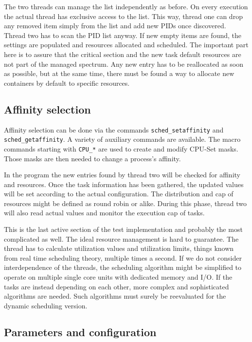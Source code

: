 \documentclass[]{scrartcl}
\begin{document}
The two threads can manage the list independently as before. On every execution the actual thread has exclusive access to the list.
This way, thread one can drop any removed item simply from the list and add new PIDs once discovered. 
Thread two has to scan the PID list anyway.
If new empty items are found, the settings are populated and resources allocated and scheduled.
The important part here is to assure that the critical section and the new task default resources are not part of the managed spectrum.
Any new entry has to be reallocated as soon as possible, but at the same time, there must be found a way to allocate new containers by default to specific resources.

\subsection{Affinity selection}

Affinity selection can be done via the commands \texttt{sched\_setaffinity} and \texttt{sched\_getaffinity}.
A variety of auxiliary commands are available. 
The macro commands starting with \texttt{CPU\_*} are used to create and modify CPU-Set masks.
Those masks are then needed to change a process's affinity.

In the program the new entries found by thread two will be checked for affinity and resources.
Once the task information has been gathered, the updated values will be set according to the actual configuration.
The distribution and cap of resources might be defined as round robin or alike.
During this phase, thread two will also read actual values and monitor the execution cap of tasks.

This is the last active section of the test implementation and probably the most complicated as well.
The ideal resource management is hard to guarantee.
The thread has to calculate utilization values and utilization limits, things known from real time scheduling theory, multiple times a second. 
If we do not consider interdependence of the threads, the scheduling algorithm might be simplified to operate on multiple single core units with dedicated memory and I/O.
If the tasks are instead depending on each other, more complex and sophisticated algorithms are needed.
Such algorithms must surely be reevaluated for the dynamic scheduling version.

\subsection{Parameters and configuration}
\end{document}
